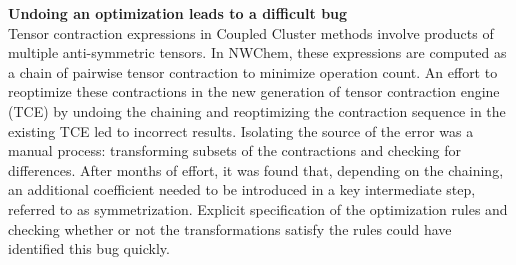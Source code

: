 \begin{WrapText}
\footnotesize
{\large \textbf{Undoing an optimization leads to a difficult bug}} \\

Tensor contraction expressions in Coupled Cluster methods involve products of multiple anti-symmetric tensors. In NWChem, these expressions are computed as a chain of pairwise tensor contraction to minimize operation count. An effort to reoptimize these contractions in the new generation of tensor contraction engine (TCE) by undoing the chaining and reoptimizing the contraction sequence in the existing TCE led to incorrect results. Isolating the source of the error was a manual process: transforming subsets of the contractions and checking for differences. After months of effort, it was found that, depending on the chaining, an additional coefficient needed to be introduced in a key intermediate step, referred to as symmetrization. Explicit specification of the optimization rules and checking whether or not the transformations satisfy the rules could have identified this bug quickly.
\end{WrapText}

